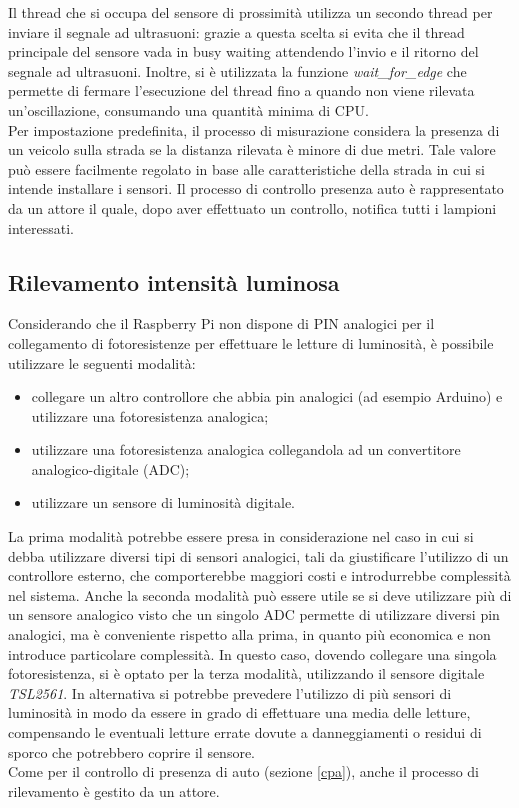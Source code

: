 Il thread che si occupa del sensore di prossimità utilizza un secondo thread per inviare il segnale ad ultrasuoni: grazie a questa scelta si evita che il thread principale del sensore vada in busy waiting attendendo l'invio e il ritorno del segnale ad ultrasuoni.
Inoltre, si è utilizzata la funzione \textit{wait\_for\_edge} che permette di fermare l'esecuzione del thread fino a quando non viene rilevata un'oscillazione, consumando una quantità minima di CPU.
\\Per impostazione predefinita, il processo di misurazione considera la presenza di un veicolo sulla strada se la distanza rilevata è minore di due metri.
Tale valore può essere facilmente regolato in base alle caratteristiche della strada in cui si intende installare i sensori.
Il processo di controllo presenza auto è rappresentato da un attore il quale, dopo aver effettuato un controllo, notifica tutti i lampioni interessati.


\subsection{Rilevamento intensità luminosa}
Considerando che il Raspberry Pi non dispone di PIN analogici per il collegamento di fotoresistenze per effettuare le letture di luminosità, è possibile utilizzare le seguenti modalità:
\begin{itemize}
 \item collegare un altro controllore che abbia pin analogici (ad esempio Arduino) e utilizzare una fotoresistenza analogica;
 \item utilizzare una fotoresistenza analogica collegandola ad un convertitore analogico-digitale (ADC);
 \item utilizzare un sensore di luminosità digitale.
\end{itemize}
La prima modalità potrebbe essere presa in considerazione nel caso in cui si debba utilizzare diversi tipi di sensori analogici, tali da giustificare l'utilizzo di un controllore esterno, che comporterebbe maggiori costi e introdurrebbe complessità nel sistema.
Anche la seconda modalità può essere utile se si deve utilizzare più di un sensore analogico visto che un singolo ADC permette di utilizzare diversi pin analogici, ma è conveniente rispetto alla prima, in quanto più economica e non introduce particolare complessità.
In questo caso, dovendo collegare una singola fotoresistenza, si è optato per la terza modalità, utilizzando il sensore digitale \textit{TSL2561}.
In alternativa si potrebbe prevedere l'utilizzo di più sensori di luminosità in modo da essere in grado di effettuare una media delle letture, compensando le eventuali letture errate dovute a danneggiamenti o residui di sporco che potrebbero coprire il sensore.
\\Come per il controllo di presenza di auto (sezione \ref{cpa}), anche il processo di rilevamento è gestito da un attore.


